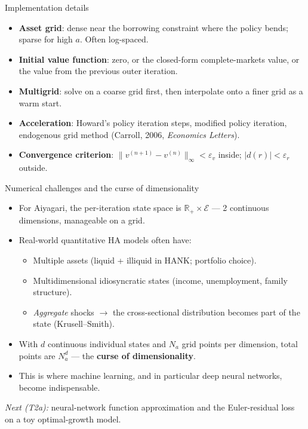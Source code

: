 \begin{frame}{Implementation details}
\begin{itemize}
\item \textbf{Asset grid}: dense near the borrowing constraint where the policy bends; sparse for high $a$. Often log-spaced.
\medskip
\item \textbf{Initial value function}: zero, or the closed-form complete-markets value, or the value from the previous outer iteration.
\medskip
\item \textbf{Multigrid}: solve on a coarse grid first, then interpolate onto a finer grid as a warm start.
\medskip
\item \textbf{Acceleration}: Howard's policy iteration steps, modified policy iteration, endogenous grid method (Carroll, 2006, \emph{Economics Letters}).
\medskip
\item \textbf{Convergence criterion}: $\|v^{(n+1)} - v^{(n)}\|_\infty < \varepsilon_v$ inside; $|d(r)| < \varepsilon_r$ outside.
\end{itemize}
\end{frame}

\begin{frame}{Numerical challenges and the curse of dimensionality}
\begin{itemize}
\item For Aiyagari, the per-iteration state space is $\mathbb{R}_+ \times \mathcal{E}$ --- 2 continuous dimensions, manageable on a grid.
\medskip
\item Real-world quantitative HA models often have:
  \begin{itemize}
  \item Multiple assets (liquid + illiquid in HANK; portfolio choice).
  \item Multidimensional idiosyncratic states (income, unemployment, family structure).
  \item \emph{Aggregate} shocks $\to$ the cross-sectional distribution becomes part of the state (Krusell--Smith).
  \end{itemize}
\medskip
\item With $d$ continuous individual states and $N_a$ grid points per dimension, total points are $N_a^d$ --- the \textbf{curse of dimensionality}.
\medskip
\item This is where machine learning, and in particular deep neural networks, become indispensable.
\end{itemize}
\medskip
\emph{Next (T2a):} neural-network function approximation and the Euler-residual loss on a toy optimal-growth model.
\end{frame}


